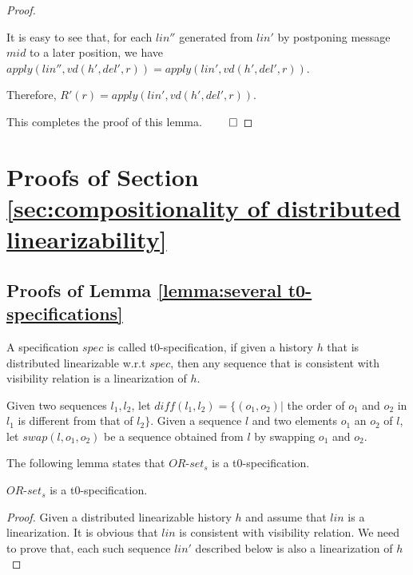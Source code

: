 {\begin {proof}
\begin{itemize}
    It is easy to see that, for each $\mathit{lin}''$ generated from $\mathit{lin}'$ by postponing message $\mathit{mid}$ to a later position, we have $\mathit{apply}(\mathit{lin}'',\mathit{vd}(h',\mathit{del}',r)) = \mathit{apply}(\mathit{lin}',\mathit{vd}(h',\mathit{del}',r))$.

    Therefore, $R'(r) = \mathit{apply}(\mathit{lin}',\mathit{vd}(h',\mathit{del}',r))$.
\end{itemize}

This completes the proof of this lemma. $\qed$
\end {proof}










\section{Proofs of Section \ref{sec:compositionality of distributed linearizability}}
\label{sec:appendix proofs of section compositionality of distributed linearizability}





\subsection{Proofs of Lemma \ref{lemma:several t0-specifications}}
\label{subsec:appendix proofs of Lemma several t0-specifications}

A specification $\mathit{spec}$ is called t0-specification, if given a history $h$ that is distributed linearizable w.r.t $\mathit{spec}$, then any sequence that is consistent with visibility relation is a linearization of $h$.

Given two sequences $l_1,l_2$, let $\mathit{diff}(l_1,l_2) = \{ (o_1,o_2) \vert$ the order of $o_1$ and $o_2$ in $l_1$ is different from that of $l_2 \}$. Given a sequence $l$ and two elements $o_1$ an $o_2$ of $l$, let $\mathit{swap}(l,o_1,o_2)$ be a sequence obtained from $l$ by swapping $o_1$ and $o_2$.

The following lemma states that $\mathit{OR}$-$\mathit{set}_s$ is a t0-specification.

\begin{lemma}
\label{lemma:or-set is a t0-specification}
$\mathit{OR}$-$\mathit{set}_s$ is a t0-specification.
\end{lemma}

\begin {proof}
Given a distributed linearizable history $h$ and assume that $\mathit{lin}$ is a linearization. It is obvious that $\mathit{lin}$ is consistent with visibility relation. We need to prove that, each such sequence $\mathit{lin}'$ described below is also a linearization of $h$


\end{proof}}

